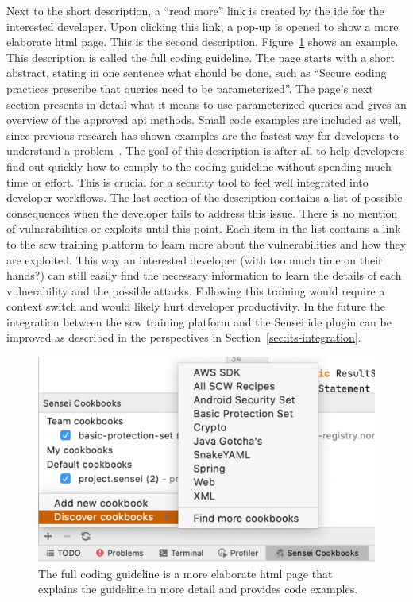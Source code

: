 Next to the short description, a “read more” link is created by the \gls{ide} for the interested developer.
Upon clicking this link, a pop-up is opened to show a more elaborate \gls{html} page.
This is the second description.
Figure~\ref{fig:fulldescription} shows an example.
This description is called the full coding guideline.
The page starts with a short abstract, stating in one sentence what should be done, such as “Secure coding practices prescribe that queries need to be parameterized”.
The page's next section presents in detail what it means to use parameterized queries and gives an overview of the approved \gls{api} methods.
Small code examples are included as well, since previous research has shown examples are the fastest way for developers to understand a problem~\cite{whitney2018embedding}.
The goal of this description is after all to help developers find out quickly how to comply to the coding guideline without spending much time or effort.
This is crucial for a security tool to feel well integrated into developer workflows.
The last section of the description contains a list of possible consequences when the developer fails to address this issue.
There is no mention of vulnerabilities or exploits until this point.
Each item in the list contains a link to the \gls{scw} training platform to learn more about the vulnerabilities and how they are exploited.
This way an interested developer (with too much time on their hands?) can still easily find the necessary information to learn the details of each vulnerability and the possible attacks.
Following this training would require a context switch and would likely hurt developer productivity.
In the future the integration between the \gls{scw} training platform and the Sensei \gls{ide} plugin can be improved as described in the perspectives in Section~\ref{sec:its-integration}.

\begin{figure}
  \centering
  \includegraphics[width=\textwidth,page=7]{04-tools/figures/figures1.pdf}
  \caption[Example of the full coding guideline.]{The full coding guideline is a more elaborate \gls{html} page that explains the guideline in more detail and provides code examples.}
  \label{fig:fulldescription}
\end{figure}

